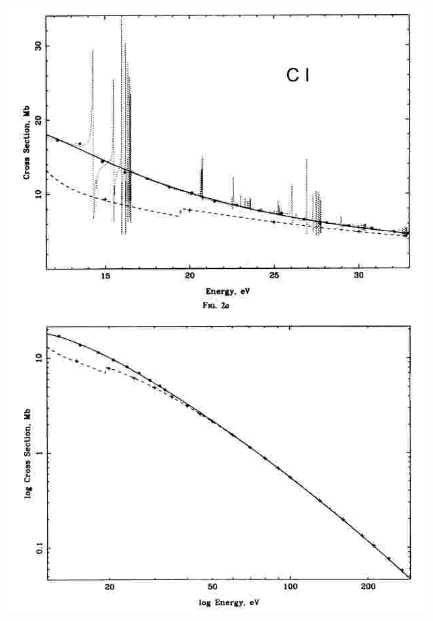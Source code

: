 

\begin{minipage}[t]{13cm}
  \begin{center}
    \includegraphics[width=12.5cm,height=16cm]{./C/ci_photion.jpg}
  \end{center}
\end{minipage}
